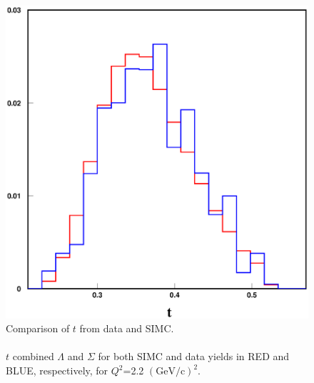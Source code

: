 \begin{figure}[!tbp]
  \centering
  \includegraphics[width=0.8\columnwidth]{com_plot_2_t_2}
  \caption[Comparison of $t$ from data and SIMC.]{\label{fig:com_plot_2_t_2}Comparison of $t$ from data and SIMC.\\\\ $t$ combined $\Lambda$ and $\Sigma$ for both SIMC and data yields in RED and BLUE, respectively, for $Q^2$=2.2 $(\mathrm{GeV/c})^2$.}
\end{figure}

